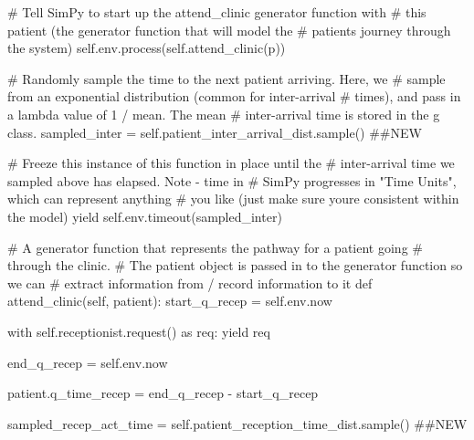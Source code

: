 \documentclass[
  letterpaper,
  DIV=11,
  numbers=noendperiod]{scrreprt}
\newenvironment{Shaded}{}{}
\newcommand{\CommentTok}[1]{\textcolor[rgb]{0.42,0.45,0.49}{#1}}
\newcommand{\ControlFlowTok}[1]{\textcolor[rgb]{0.84,0.23,0.29}{#1}}
\newcommand{\ImportTok}[1]{\textcolor[rgb]{0.01,0.18,0.38}{#1}}
\newcommand{\KeywordTok}[1]{\textcolor[rgb]{0.84,0.23,0.29}{#1}}
\newcommand{\NormalTok}[1]{\textcolor[rgb]{0.14,0.16,0.18}{#1}}
\newcommand{\OperatorTok}[1]{\textcolor[rgb]{0.14,0.16,0.18}{#1}}
\newcommand{\VariableTok}[1]{\textcolor[rgb]{0.89,0.38,0.04}{#1}}
\begin{document}
\begin{tcolorbox}
\begin{Shaded}
\begin{Highlighting}[]
            \CommentTok{\# Tell SimPy to start up the attend\_clinic generator function with}
            \CommentTok{\# this patient (the generator function that will model the}
            \CommentTok{\# patient\textquotesingle{}s journey through the system)}
            \VariableTok{self}\NormalTok{.env.process(}\VariableTok{self}\NormalTok{.attend\_clinic(p))}

            \CommentTok{\# Randomly sample the time to the next patient arriving.  Here, we}
            \CommentTok{\# sample from an exponential distribution (common for inter{-}arrival}
            \CommentTok{\# times), and pass in a lambda value of 1 / mean.  The mean}
            \CommentTok{\# inter{-}arrival time is stored in the g class.}
\NormalTok{            sampled\_inter }\OperatorTok{=} \VariableTok{self}\NormalTok{.patient\_inter\_arrival\_dist.sample() }\CommentTok{\#\#NEW}

            \CommentTok{\# Freeze this instance of this function in place until the}
            \CommentTok{\# inter{-}arrival time we sampled above has elapsed.  Note {-} time in}
            \CommentTok{\# SimPy progresses in "Time Units", which can represent anything}
            \CommentTok{\# you like (just make sure you\textquotesingle{}re consistent within the model)}
            \ControlFlowTok{yield} \VariableTok{self}\NormalTok{.env.timeout(sampled\_inter)}

    \CommentTok{\# A generator function that represents the pathway for a patient going}
    \CommentTok{\# through the clinic.}
    \CommentTok{\# The patient object is passed in to the generator function so we can}
    \CommentTok{\# extract information from / record information to it}
    \KeywordTok{def}\NormalTok{ attend\_clinic(}\VariableTok{self}\NormalTok{, patient):}
\NormalTok{        start\_q\_recep }\OperatorTok{=} \VariableTok{self}\NormalTok{.env.now}

        \ControlFlowTok{with} \VariableTok{self}\NormalTok{.receptionist.request() }\ImportTok{as}\NormalTok{ req:}
            \ControlFlowTok{yield}\NormalTok{ req}

\NormalTok{            end\_q\_recep }\OperatorTok{=} \VariableTok{self}\NormalTok{.env.now}

\NormalTok{            patient.q\_time\_recep }\OperatorTok{=}\NormalTok{ end\_q\_recep }\OperatorTok{{-}}\NormalTok{ start\_q\_recep}

\NormalTok{            sampled\_recep\_act\_time }\OperatorTok{=} \VariableTok{self}\NormalTok{.patient\_reception\_time\_dist.sample() }\CommentTok{\#\#NEW}


\end{Highlighting}
\end{Shaded}
\end{tcolorbox}
\end{document}
